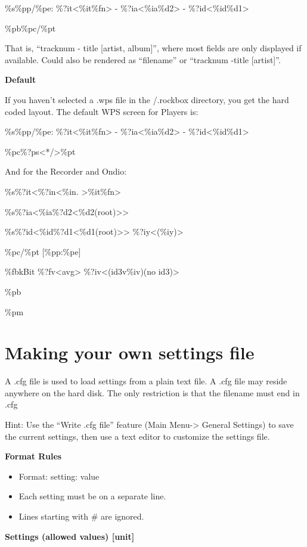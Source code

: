 \%s\%pp/\%pe: \%?it{\textless}\%it{\textbar}\%fn{\textgreater} {}-
\%?ia{\textless}\%ia{\textbar}\%d2{\textgreater} {}-
\%?id{\textless}\%id{\textbar}\%d1{\textgreater}

\%pb\%pc/\%pt

That is, ``tracknum {}- title [artist,
album]'', where most fields are only displayed if
available. Could also be rendered as
``filename'' or ``tracknum {}-title [artist]''.

{\bfseries
Default}

If you haven't selected a .wps file in the /.rockbox
directory, you get the hard coded layout. The default WPS screen for
Players is:

\%s\%pp/\%pe: \%?it{\textless}\%it{\textbar}\%fn{\textgreater} {}-
\%?ia{\textless}\%ia{\textbar}\%d2{\textgreater} {}-
\%?id{\textless}\%id{\textbar}\%d1{\textgreater}

\%pc\%?ps{\textless}*{\textbar}/{\textgreater}\%pt

And for the Recorder and Ondio:

\%s\%?it{\textless}\%?in{\textless}\%in.
{\textbar}{\textgreater}\%it{\textbar}\%fn{\textgreater}

\%s\%?ia{\textless}\%ia{\textbar}\%?d2{\textless}\%d2{\textbar}(root){\textgreater}{\textgreater}

\%s\%?id{\textless}\%id{\textbar}\%?d1{\textless}\%d1{\textbar}(root){\textgreater}{\textgreater}
\%?iy{\textless}(\%iy){\textbar}{\textgreater}

\%pc/\%pt [\%pp:\%pe]

\%fbkBit \%?fv{\textless}avg{\textbar}{\textgreater}
\%?iv{\textless}(id3v\%iv){\textbar}(no id3){\textgreater}

\%pb

\%pm

\section{\label{ref:SettingsFile}Making your own settings file}
A .cfg file is used to load settings from a plain text file. A .cfg file
may reside anywhere on the hard disk. The only restriction is that the
filename must end in .cfg

Hint: Use the ``Write .cfg file'' feature
(Main Menu{}-{\textgreater} General Settings) to save the current
settings, then use a text editor to customize the settings file.

{\bfseries
Format Rules}

\begin{itemize}
\item Format: setting: value
\item Each setting must be on a separate line.
\item Lines starting with \# are ignored.
\end{itemize}
{\bfseries
Settings    (allowed values) [unit]}

